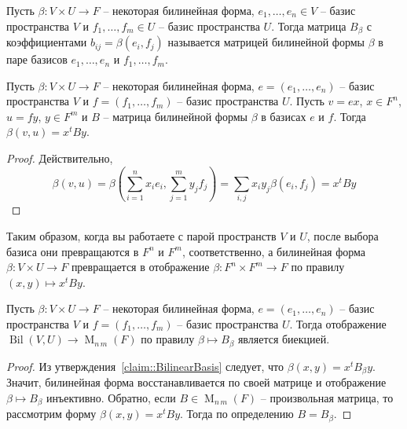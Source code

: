 \begin{definition}
Пусть $\beta\colon V\times U\to F$ -- некоторая билинейная форма,  $e_1,\ldots,e_n\in V$ -- базис пространства $V$ и $f_1,\ldots,f_m\in U$ -- базис пространства $U$. Тогда матрица $B_\beta$ с коэффициентами $b_{ij} = \beta(e_i,f_j)$ называется матрицей билинейной формы $\beta$ в паре базисов $e_1,\ldots,e_n$ и $f_1,\ldots,f_m$.
\end{definition}


\begin{claim}\label{claim::BilinearBasis}
Пусть $\beta\colon V\times U\to F$ -- некоторая билинейная форма,  $e = (e_1,\ldots,e_n)$ -- базис пространства $V$ и $f=(f_1,\ldots,f_m)$ -- базис пространства $U$. Пусть $v = ex$, $x\in F^n$, $u =fy$, $y\in F^m$ и $B$ -- матрица билинейной формы $\beta$ в базисах $e$ и $f$. Тогда $\beta(v,u) = x^t B y$.
\end{claim}
\begin{proof}
Действительно, 
\[
\beta(v,u) = \beta(\sum_{i=1}^n x_i e_i, \sum_{j=1}^m y_j f_j) = \sum_{i,j} x_iy_j\beta(e_i, f_j) = x^t B y
\]
\end{proof}

Таким образом, когда вы работаете с парой пространств $V$ и $U$, после выбора базиса они превращаются в $F^n$ и $F^m$, соответственно, а билинейная форма $\beta\colon V\times U\to F$ превращается в отображение $\beta\colon F^n \times F^m \to F$ по правилу $(x,y)\mapsto x^t B y$.



\begin{claim}\label{claim::BilinearMatrices}
Пусть $\beta\colon V\times U\to F$ -- некоторая билинейная форма,  $e = (e_1,\ldots,e_n)$ -- базис пространства $V$ и $f=(f_1,\ldots,f_m)$ -- базис пространства $U$. Тогда отображение $\operatorname{Bil}(V,U)\to \operatorname{M}_{n\,m}(F)$ по правилу $\beta\mapsto B_\beta$ является биекцией.
\end{claim}
\begin{proof}
Из утверждения~\ref{claim::BilinearBasis} следует, что $\beta(x,y) = x^t B_\beta y$. Значит, билинейная форма восстанавливается по своей матрице и отображение $\beta\mapsto B_\beta$ инъективно. Обратно, если $B\in \operatorname{M}_{n\,m}(F)$ -- произвольная матрица, то рассмотрим форму $\beta(x,y) = x^t B y$. Тогда по определению $B = B_\beta$.
\end{proof}


